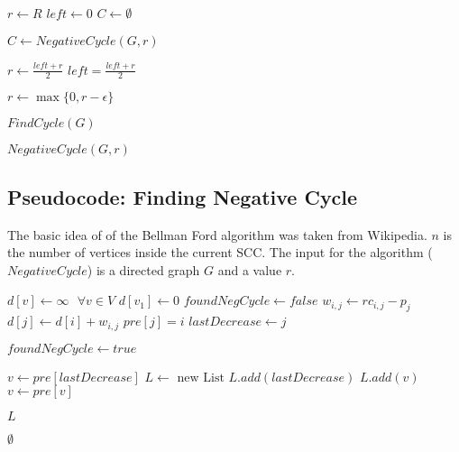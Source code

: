 \documentclass[12pt]{article}
\begin{document}
\begin{algorithmic}
	\State $r \gets R$
	\State $\mathit{left} \gets 0$
	\State $C \gets \emptyset$

		\State $C \gets \mathit{NegativeCycle}(G, r)$

			\State $r \gets \frac{\mathit{left} + r}{2}$
		\Else
			\State $\mathit{left} = \frac{\mathit{left} + r}{2}$
		\EndIf
	\EndWhile

		\State $r \gets \max\{ 0, r-\epsilon \}$

			\Return $\mathit{FindCycle}(G)$
		\Else

			\Return $\mathit{NegativeCycle}(G, r)$
		\EndIf
	\EndIf
\end{algorithmic}

\subsection*{Pseudocode: Finding Negative Cycle}
The basic idea of of the Bellman Ford algorithm was taken from Wikipedia. $n$ is the number of vertices inside the current SCC. The input for the algorithm ($\mathit{NegativeCycle}$) is a directed graph $G$ and a value $r$.

\begin{algorithmic}
	\State $d[v] \gets \infty \mbox{      } \forall v \in V$
	\State $d[v_1] \gets 0$
	\State $\mathit{foundNegCycle} \gets \mathit{false}$
			\State $w_{i,j} \gets r c_{i,j} - p_j$
				\State $d[j] \gets d[i] + w_{i,j}$
				\State $\mathit{pre}[j] = i$
				\State $\mathit{lastDecrease} \gets j$

					\State $\mathit{foundNegCycle} \gets \mathit{true}$
				\EndIf
			\EndIf
		\EndFor
	\EndFor

	\State $v \gets \mathit{pre}[\mathit{lastDecrease}]$
	\State $L \gets \mbox{ new List}$
	\State $L.\mathit{add}(lastDecrease)$
		\State $L.\mathit{add}(v)$
		\State $v \gets \mathit{pre}[v]$
	\EndWhile

	\Return $L$
	\EndIf
	\EndFor

	\Return $\emptyset$
\end{algorithmic}
\end{document}
